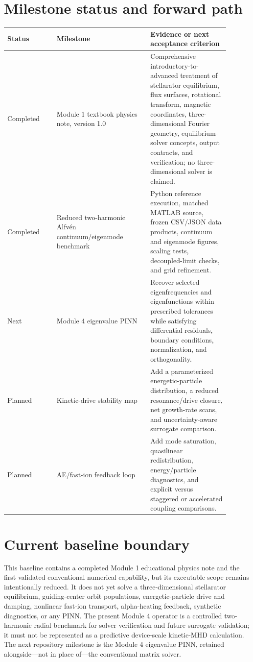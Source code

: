 \documentclass[11pt]{article}
\begin{document}
\section{Milestone status and forward path}
\begin{longtable}{p{0.20\linewidth} p{0.38\linewidth} p{0.32\linewidth}}
\toprule
\textbf{Status} & \textbf{Milestone} & \textbf{Evidence or next acceptance criterion}\\
\midrule
Completed & Module 1 textbook physics note, version 1.0 & Comprehensive introductory-to-advanced treatment of stellarator equilibrium, flux surfaces, rotational transform, magnetic coordinates, three-dimensional Fourier geometry, equilibrium-solver concepts, output contracts, and verification; no three-dimensional solver is claimed.\\
Completed & Reduced two-harmonic Alfv\'en continuum/eigenmode benchmark & Python reference execution, matched MATLAB source, frozen CSV/JSON data products, continuum and eigenmode figures, scaling tests, decoupled-limit checks, and grid refinement.\\
Next & Module 4 eigenvalue PINN & Recover selected eigenfrequencies and eigenfunctions within prescribed tolerances while satisfying differential residuals, boundary conditions, normalization, and orthogonality.\\
Planned & Kinetic-drive stability map & Add a parameterized energetic-particle distribution, a reduced resonance/drive closure, net growth-rate scans, and uncertainty-aware surrogate comparison.\\
Planned & AE/fast-ion feedback loop & Add mode saturation, quasilinear redistribution, energy/particle diagnostics, and explicit versus staggered or accelerated coupling comparisons.\\
\bottomrule
\end{longtable}

\section{Current baseline boundary}
This baseline contains a completed Module 1 educational physics note and the first validated conventional numerical capability, but its executable scope remains intentionally reduced. It does not yet solve a three-dimensional stellarator equilibrium, guiding-center orbit populations, energetic-particle drive and damping, nonlinear fast-ion transport, alpha-heating feedback, synthetic diagnostics, or any PINN. The present Module 4 operator is a controlled two-harmonic radial benchmark for solver verification and future surrogate validation; it must not be represented as a predictive device-scale kinetic-MHD calculation. The next repository milestone is the Module 4 eigenvalue PINN, retained alongside---not in place of---the conventional matrix solver.
\end{document}
